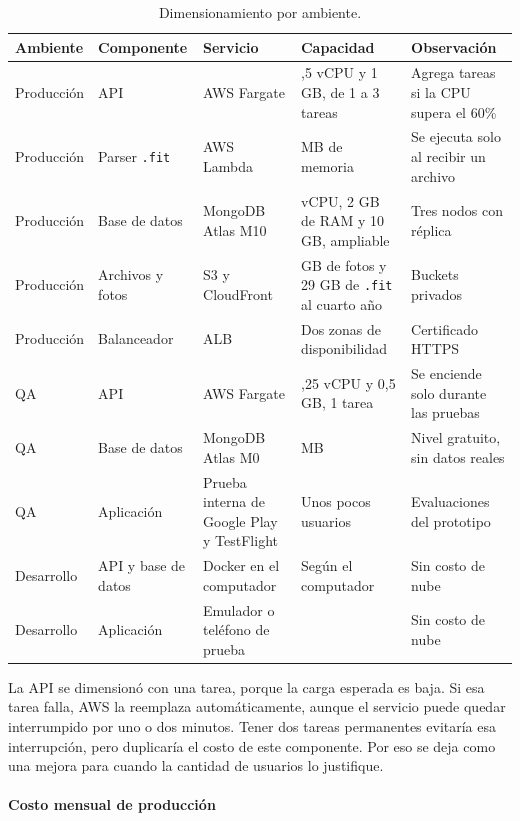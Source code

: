 \begin{table}[h!]
    \centering
    \renewcommand{\arraystretch}{1.25}
    \footnotesize
    \begin{tabular}{|>{\raggedright\arraybackslash}p{1.9cm}|>{\raggedright\arraybackslash}p{3.3cm}|>{\raggedright\arraybackslash}p{2.9cm}|>{\raggedright\arraybackslash}p{3.2cm}|>{\raggedright\arraybackslash}p{2.9cm}|}
        \hline
        \rowcolor[HTML]{EFEFEF}
        \textbf{Ambiente} & \textbf{Componente} & \textbf{Servicio} & \textbf{Capacidad} & \textbf{Observación} \\ \hline
        Producción & API & AWS Fargate & 0,5 vCPU y 1 GB, de 1 a 3 tareas & Agrega tareas si la CPU supera el 60\% \\ \hline
        Producción & Parser \texttt{.fit} & AWS Lambda & 1.769 MB de memoria & Se ejecuta solo al recibir un archivo \\ \hline
        Producción & Base de datos & MongoDB Atlas M10 & 2 vCPU, 2 GB de RAM y 10 GB, ampliable & Tres nodos con réplica \\ \hline
        Producción & Archivos y fotos & S3 y CloudFront & 118 GB de fotos y 29 GB de \texttt{.fit} al cuarto año & Buckets privados \\ \hline
        Producción & Balanceador & ALB & Dos zonas de disponibilidad & Certificado HTTPS \\ \hline
        QA & API & AWS Fargate & 0,25 vCPU y 0,5 GB, 1 tarea & Se enciende solo durante las pruebas \\ \hline
        QA & Base de datos & MongoDB Atlas M0 & 512 MB & Nivel gratuito, sin datos reales \\ \hline
        QA & Aplicación & Prueba interna de Google Play y TestFlight & Unos pocos usuarios & Evaluaciones del prototipo \\ \hline
        Desarrollo & API y base de datos & Docker en el computador & Según el computador & Sin costo de nube \\ \hline
        Desarrollo & Aplicación & Emulador o teléfono de prueba &  & Sin costo de nube \\ \hline
    \end{tabular}
    \caption{Dimensionamiento por ambiente.}
    \label{tab:ambientes}
\end{table}

La API se dimensionó con una tarea, porque la carga esperada es baja. Si esa tarea falla, AWS la reemplaza automáticamente, aunque el servicio puede quedar interrumpido por uno o dos minutos. Tener dos tareas permanentes evitaría esa interrupción, pero duplicaría el costo de este componente. Por eso se deja como una mejora para cuando la cantidad de usuarios lo justifique.
\\\\
\textbf{Costo mensual de producción}

